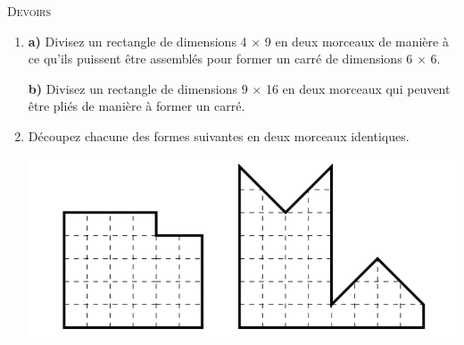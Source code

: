 \documentclass{article}
\begin{document}
\vspace{1ex}
\begin{center}\textsc{\Large{Devoirs}}\end{center}
\begin{enumerate}
    \item \textbf{a)} Divisez un rectangle de dimensions 4 × 9 en deux morceaux de manière à ce qu'ils puissent être assemblés pour former un carré de dimensions 6 × 6. \par
    \textbf{b)} Divisez un rectangle de dimensions 9 × 16 en deux morceaux qui peuvent être pliés de manière à former un carré.
    \item Découpez chacune des formes suivantes en deux morceaux identiques.
    \vspace{-2ex}
    \begin{center}
        \includegraphics[scale=0.3]{8.png}        
    \end{center}
    \vspace{-3ex}
\end{enumerate}
\end{document}
